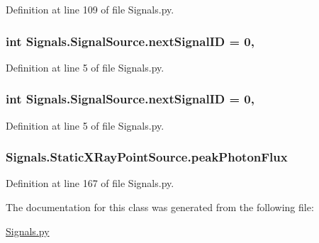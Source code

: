 Definition at line 109 of file Signals.\+py.

\subsubsection[{\texorpdfstring{next\+Signal\+ID}{nextSignalID}}]{\setlength{\rightskip}{0pt plus 5cm}int Signals.\+Signal\+Source.\+next\+Signal\+ID = 0\hspace{0.3cm}{\ttfamily [static]}, {\ttfamily [inherited]}}\hypertarget{classSignals_1_1SignalSource_abcff0d069f17cb5ebe3eff15b6283a64}{}\label{classSignals_1_1SignalSource_abcff0d069f17cb5ebe3eff15b6283a64}


Definition at line 5 of file Signals.\+py.

\subsubsection[{\texorpdfstring{next\+Signal\+ID}{nextSignalID}}]{\setlength{\rightskip}{0pt plus 5cm}int Signals.\+Signal\+Source.\+next\+Signal\+ID = 0\hspace{0.3cm}{\ttfamily [static]}, {\ttfamily [inherited]}}\hypertarget{classSignals_1_1SignalSource_abcff0d069f17cb5ebe3eff15b6283a64}{}\label{classSignals_1_1SignalSource_abcff0d069f17cb5ebe3eff15b6283a64}


Definition at line 5 of file Signals.\+py.

\subsubsection[{\texorpdfstring{peak\+Photon\+Flux}{peakPhotonFlux}}]{\setlength{\rightskip}{0pt plus 5cm}Signals.\+Static\+X\+Ray\+Point\+Source.\+peak\+Photon\+Flux}\hypertarget{classSignals_1_1StaticXRayPointSource_a7e16da6506ee1b83c9858dce9c7856ea}{}\label{classSignals_1_1StaticXRayPointSource_a7e16da6506ee1b83c9858dce9c7856ea}


Definition at line 167 of file Signals.\+py.



The documentation for this class was generated from the following file\+:\begin{DoxyCompactItemize}
\item 
\hyperlink{Signals_8py}{Signals.\+py}\end{DoxyCompactItemize}
